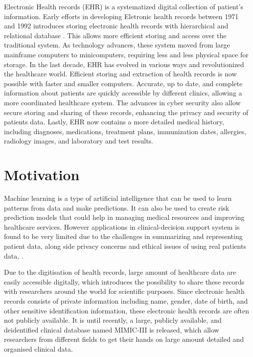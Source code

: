 \documentclass{l4proj}
\begin{document}
Electronic Health records (EHR) is a systematized digital collection of patient's information. Early efforts in developing Eletronic health records between 1971 and 1992 introduces storing electronic health records with hierarchical and relational database \cite{Evans2016-bp}.  This allows more efficient storing and access over the traditional system. As technology advances, these system moved from large mainframe computers to minicomputers, requiring less and less physical space for storage. In the last decade, EHR has evolved in various ways and revolutionized the healthcare world. Efficient storing and extraction of health records is now possible with faster and smaller computers. Accurate, up to date, and complete information about patients are quickly accessible by different clinics, allowing a more coordinated healthcare system. The advances in cyber security also allow secure storing and sharing of these records, enhancing the privacy and security of patients data. Lastly, EHR now contains a more detailed medical history, including diagnoses, medications, treatment plans, immunization dates, allergies, radiology images, and laboratory and test results.



\section{Motivation}

Machine learning is a type of artificial intelligence that can be used to learn patterns from data and make predictions. It can also be used to create risk prediction models that could help in managing medical resources and improving healthcare services. However applications in clinical-decision support system is found to be very limited due to the challenges in summarizing and representing patient data, along side privacy concerns and ethical issues of using real patients data, \cite{AyalaSolares2020}.

Due to the digitisation of health records, large amount of healthcare data are easily accessible digitally, which introduces the possibility to share these records with researchers around the world for scientific purposes. Since electronic health records consists of private information including name, gender, date of birth, and other sensitive identification information, these electronic health records are often not publicly available. It is until recently, a large, publicly available, and deidentified clinical database named MIMIC-III is released, which allow researchers from different fields to get their hands on large amount detailed and organised clinical data.
\end{document}
